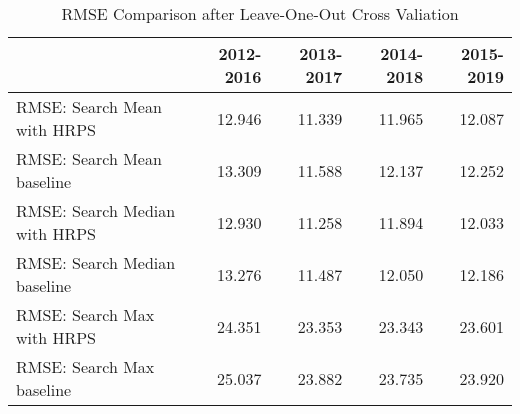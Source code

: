 \begin{table}[ht]
\centering
\begin{tabular}{|l|rrrr|}
  \hline
 & 2012-2016 & 2013-2017 & 2014-2018 & 2015-2019 \\ 
  \hline
RMSE: Search Mean with HRPS & 12.946 & 11.339 & 11.965 & 12.087 \\ 
  RMSE: Search Mean baseline & 13.309 & 11.588 & 12.137 & 12.252 \\ 
  RMSE: Search Median with HRPS & 12.930 & 11.258 & 11.894 & 12.033 \\ 
  RMSE: Search Median baseline & 13.276 & 11.487 & 12.050 & 12.186 \\ 
  RMSE: Search Max with HRPS & 24.351 & 23.353 & 23.343 & 23.601 \\ 
  RMSE: Search Max baseline & 25.037 & 23.882 & 23.735 & 23.920 \\ 
   \hline
\end{tabular}
\caption{RMSE Comparison after Leave-One-Out Cross Valiation} 
\end{table}
